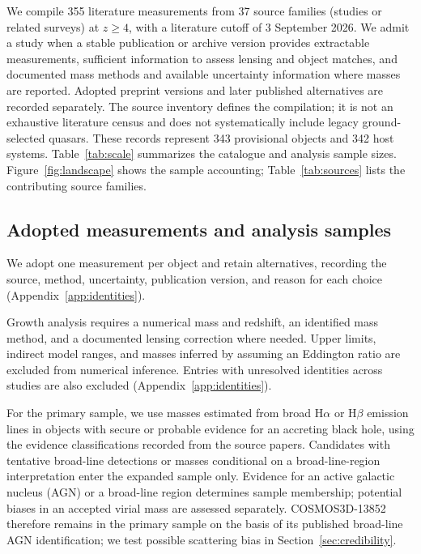 \documentclass[pdflatex,sn-basic]{sn-jnl}
\begin{document}
We compile 355 literature measurements from 37 source families (studies or
related surveys) at $z\geq4$, with a literature cutoff of 3 September 2026.
We admit a study when a stable publication or archive version provides
extractable measurements, sufficient information to assess lensing and object
matches, and documented mass methods and available uncertainty information where masses
are reported. Adopted
preprint versions and later published alternatives are recorded separately.
The source inventory defines the compilation; it is not an exhaustive literature
census and does not systematically include legacy ground-selected quasars.
These records represent 343 provisional objects and 342 host systems.
Table~\ref{tab:scale} summarizes the catalogue and analysis sample sizes.
Figure~\ref{fig:landscape} shows the sample accounting;
Table~\ref{tab:sources} lists the contributing source families.


\subsection{Adopted measurements and analysis samples}

We adopt one measurement per object and retain alternatives, recording the
source, method, uncertainty, publication version, and reason for each choice
(Appendix~\ref{app:identities}).

Growth analysis requires a numerical mass and redshift, an identified mass
method, and a documented lensing correction where needed. Upper limits, indirect model ranges,
and masses inferred by assuming an Eddington ratio are excluded from numerical
inference. Entries with unresolved identities across studies are also excluded
(Appendix~\ref{app:identities}).


For the primary sample, we use masses estimated from broad H$\alpha$ or
H$\beta$ emission lines in objects with secure or probable evidence for an
accreting black hole, using the evidence classifications recorded from the
source papers. Candidates with tentative broad-line detections or masses conditional on
a broad-line-region interpretation enter the expanded sample only.
Evidence for an active galactic nucleus (AGN) or a broad-line region determines
sample membership; potential biases in an accepted virial mass are assessed
separately.
COSMOS3D-13852 therefore remains in the primary sample on the basis of its
published broad-line AGN identification; we test possible scattering bias in
Section~\ref{sec:credibility}.
\end{document}
